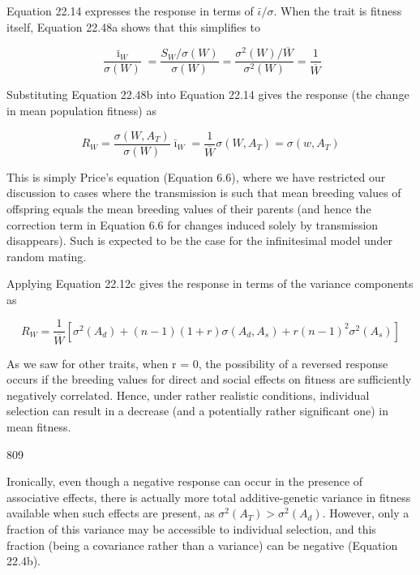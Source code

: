 \documentclass{article}
\begin{document}
Equation 22.14 expresses the response in terms of  $ \bar{\iota}/\sigma $. When the trait is fitness itself, Equation 22.48a shows that this simplifies to

\begin{equation}
\frac{\bar{\imath}_{W}}{\sigma(W)}=\frac{S_{W}/\sigma(W)}{\sigma(W)}=\frac{\sigma^{2}(W)/\overline{W}}{\sigma^{2}(W)}=\frac{1}{\overline{W}}
\tag{22.48b}
\label{eq:22_48b}
\end{equation}

Substituting Equation 22.48b into Equation 22.14 gives the response (the change in mean population fitness) as

\begin{equation}
R_{W}=\frac{\sigma(W,A_{T})}{\sigma(W)}\bar{\imath}_{W}=\frac{1}{\overline{W}}\sigma(W,A_{T})=\sigma(w,A_{T})
\tag{22.48c}
\label{eq:22_48c}
\end{equation}

This is simply Price’s equation (Equation 6.6), where we have restricted our discussion to cases where the transmission is such that mean breeding values of offspring equals the mean breeding values of their parents (and hence the correction term in Equation 6.6 for changes induced solely by transmission disappears). Such is expected to be the case for the infinitesimal model under random mating.

Applying Equation 22.12c gives the response in terms of the variance components as

\begin{equation}
R_{W}=\frac{1}{\overline{W}}\left[\sigma^{2}(A_{d})+(n-1)(1+r)\sigma(A_{d},A_{s})+r(n-1)^{2}\sigma^{2}\left(A_{s}\right)\right]
\tag{22.48d}
\label{eq:22_48d}
\end{equation}

As we saw for other traits, when r = 0, the possibility of a reversed response occurs if the breeding values for direct and social effects on fitness are sufficiently negatively correlated. Hence, under rather realistic conditions, individual selection can result in a decrease (and a potentially rather significant one) in mean fitness.

809

Ironically, even though a negative response can occur in the presence of associative effects, there is actually more total additive-genetic variance in fitness available when such effects are present, as  $ \sigma^{2}(A_{T}) > \sigma^{2}(A_{d}) $. However, only a fraction of this variance may be accessible to individual selection, and this fraction (being a covariance rather than a variance) can be negative (Equation 22.4b).
\end{document}
